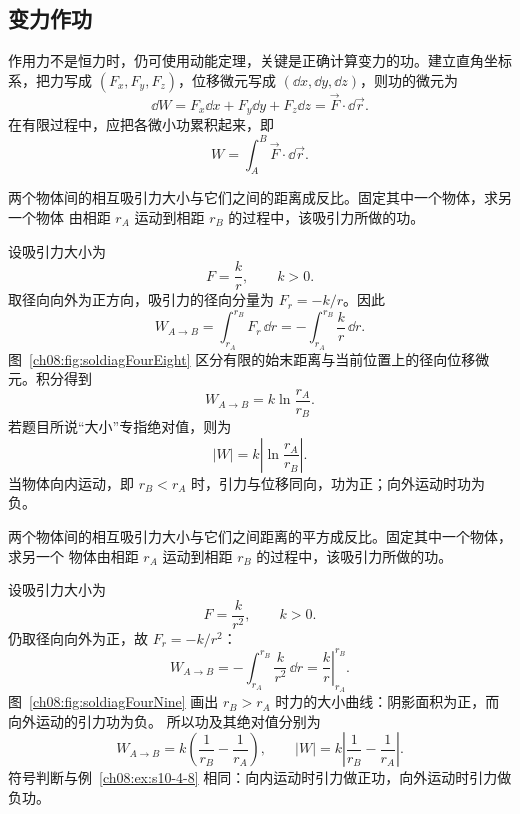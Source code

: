 {\subsection{变力作功}

作用力不是恒力时，仍可使用动能定理，关键是正确计算变力的功。建立直角坐标系，把力写成
$(F_x,F_y,F_z)$，位移微元写成 $(\dd x,\dd y,\dd z)$，则功的微元为
\begin{equation}
 \dd W=F_x\dd x+F_y\dd y+F_z\dd z=\vec F\cdot\dd\vec r.
\end{equation}
在有限过程中，应把各微小功累积起来，即
\[
 W=\int_A^B\vec F\cdot\dd\vec r.
\]




\begin{origexamplebox}{}\label{ch08:ex:s10-4-8}
两个物体间的相互吸引力大小与它们之间的距离成反比。固定其中一个物体，求另一个物体
由相距 $r_A$ 运动到相距 $r_B$ 的过程中，该吸引力所做的功。

\ThQInverseForce
\end{origexamplebox}

\begin{xesolution}
设吸引力大小为
\[
 F=\frac{k}{r},
 \qquad k>0.
\]
取径向向外为正方向，吸引力的径向分量为 $F_r=-k/r$。因此
\[
 W_{A\to B}
 =\int_{r_A}^{r_B}F_r\,\dd r
 =-\int_{r_A}^{r_B}\frac{k}{r}\,\dd r.
\]
\soldiagFourEight
图~\ref{ch08:fig:soldiagFourEight} 区分有限的始末距离与当前位置上的径向位移微元。积分得到
\[
 \boxed{W_{A\to B}=k\ln\frac{r_A}{r_B}}.
\]
若题目所说“大小”专指绝对值，则为
\[
 \boxed{|W|=k\left|\ln\frac{r_A}{r_B}\right|}.
\]
当物体向内运动，即 $r_B<r_A$ 时，引力与位移同向，功为正；向外运动时功为负。
\end{xesolution}

\begin{origexamplebox}{}\label{ch08:ex:s10-4-9}
两个物体间的相互吸引力大小与它们之间距离的平方成反比。固定其中一个物体，求另一个
物体由相距 $r_A$ 运动到相距 $r_B$ 的过程中，该吸引力所做的功。

\ThQInverseSquareForce
\end{origexamplebox}

\begin{xesolution}
设吸引力大小为
\[
 F=\frac{k}{r^2},
 \qquad k>0.
\]
仍取径向向外为正，故 $F_r=-k/r^2$：
\[
 W_{A\to B}
 =-\int_{r_A}^{r_B}\frac{k}{r^2}\,\dd r
 =\left.\frac{k}{r}\right|_{r_A}^{r_B}.
\]
\soldiagFourNine
图~\ref{ch08:fig:soldiagFourNine} 画出 $r_B>r_A$ 时力的大小曲线：阴影面积为正，而向外运动的引力功为负。
所以功及其绝对值分别为
\[
\boxed{
 W_{A\to B}=k\left(\frac1{r_B}-\frac1{r_A}\right)},
\qquad
\boxed{
 |W|=k\left|\frac1{r_B}-\frac1{r_A}\right|}.
\]
符号判断与例~\ref{ch08:ex:s10-4-8} 相同：向内运动时引力做正功，向外运动时引力做负功。
\end{xesolution}
}

